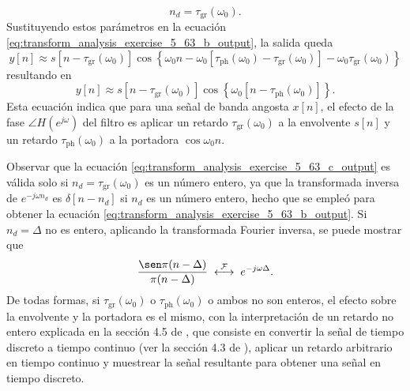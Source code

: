 \documentclass[a4paper]{report}
\begin{document}
\begin{enumerate}
\[  n_d=\tau_\textrm{gr}(\omega_0).
 \]
 Sustituyendo estos parámetros en la ecuación \ref{eq:transform_analysis_exercise_5_63_b_output}, la salida queda
 \[
  y[n]\approx s[n-\tau_\textrm{gr}(\omega_0)]\cos\left\{\omega_0n-\omega_0[\tau_\textrm{ph}(\omega_0)-\tau_\textrm{gr}(\omega_0)]-\omega_0\tau_\textrm{gr}(\omega_0)\right\}
 \]
 resultando en 
 \begin{equation}\label{eq:transform_analysis_exercise_5_63_c_output}
  y[n]\approx s[n-\tau_\textrm{gr}(\omega_0)]\cos\left\{\omega_0[n-\tau_\textrm{ph}(\omega_0)]\right\}.  
 \end{equation}
 Esta ecuación indica que para una señal de banda angosta \(x[n]\), el efecto de la fase \(\angle H(e^{j\omega})\) del filtro es aplicar un retardo \(\tau_\textrm{gr}(\omega_0)\) a la envolvente \(s[n]\) y un retardo \(\tau_\textrm{ph}(\omega_0)\) a la portadora \(\cos\omega_0n\).
 
 Observar que la ecuación \ref{eq:transform_analysis_exercise_5_63_c_output} es válida solo si \(n_d=\tau_\textrm{gr}(\omega_0)\) es un número entero, ya que la transformada inversa de \(e^{-j\omega n_d}\) es \(\delta[n-n_d]\) si \(n_d\) es un número entero, hecho que se empleó para obtener la ecuación \ref{eq:transform_analysis_exercise_5_63_b_output}. Si \(n_d=\Delta\) no es entero, aplicando la transformada Fourier inversa, se puede mostrar que 
 \[
  \frac{\sen\pi(n-\Delta)}{\pi(n-\Delta)}\;\overset{\mathcal{F}}{\longleftrightarrow}\;e^{-j\omega\Delta}.
 \]
 De todas formas, si \(\tau_\textrm{gr}(\omega_0)\) o \(\tau_\textrm{ph}(\omega_0)\) o ambos no son enteros, el efecto sobre la envolvente y la portadora es el mismo, con la interpretación de un retardo no entero explicada en la sección 4.5 de \cite{oppenheim2009discrete}, que consiste en convertir la señal de tiempo discreto a tiempo continuo (ver la sección 4.3 de \cite{oppenheim2009discrete}), aplicar un retardo arbitrario en tiempo continuo y muestrear la señal resultante para obtener una señal en tiempo discreto.
 

\end{enumerate}
\end{document}
